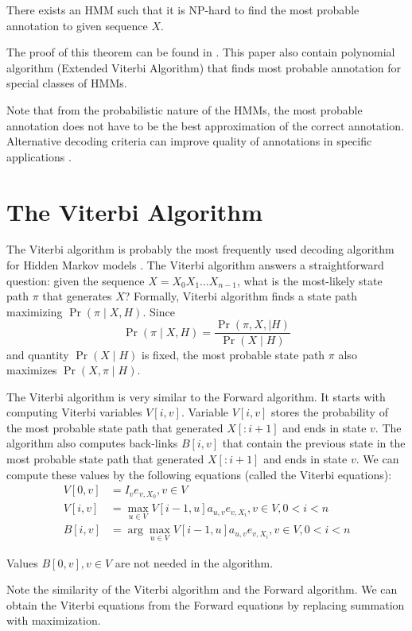 \begin{theorem}
There exists an HMM such that it is NP-hard to find the most probable annotation
to given sequence $X$.
\end{theorem}
The proof of this theorem can be found in \cite{Brejova2007mpa}. This paper also
contain polynomial algorithm (Extended Viterbi Algorithm) that finds most
probable annotation for special classes of HMMs. 

Note that from the probabilistic nature of the HMMs, the most probable
annotation does not have to be the best approximation of the correct annotation.
Alternative decoding criteria can improve quality of annotations in specific
applications \cite{Brown2010,Gross2007,Nanasi2010,Truszkowski2011}.

\section{The Viterbi Algorithm}
The Viterbi algorithm  is probably the most frequently used
decoding algorithm for Hidden Markov
models \cite{Durbin1998}.
The Viterbi algorithm answers a straightforward question: given the sequence
$X=X_0X_1\dots X_{n-1}$, what
is the most-likely state path $\pi$ that generates $X$? Formally, Viterbi
algorithm finds a state path maximizing $\Pr\left( \pi\mid X,H \right)$. Since
\[\Pr\left(\pi\mid X,H\right) = \frac{\Pr\left(\pi,X,\mid
H\right)}{\Pr\left(X\mid H\right)}\] and quantity $\Pr\left(X\mid H\right)$ is
fixed, the most probable state path $\pi$ also maximizes $\Pr\left(X,\pi\mid H\right)$. 

The Viterbi algorithm is very similar to the  Forward algorithm. It starts with computing
Viterbi variables $V[i,v]$. Variable $V[i,v]$ stores the probability of the most probable 
state path that generated $X[:i+1]$ and ends in state $v$. The algorithm
also computes back-links $B[i,v]$ that contain the previous state in the most
probable state path that generated $X[:i+1]$ and ends in state $v$. We can
compute these values by the following equations (called the Viterbi equations):
\begin{align}
V[0,v] &= I_{v}e_{v,X_0}, v\in V\\
V[i,v] &= \max_{u\in V} V[i-1,u]a_{u,v}e_{v,X_i}, v\in V,0<i<n\\
B[i,v] &= \arg\max_{u\in V} V[i-1,u]a_{u,v}e_{v,X_i}, v\in V,0<i<n
\end{align}
\begin{note}
Values $B[0,v],v\in V$ are not needed in the algorithm.

Note the similarity of the Viterbi algorithm and the Forward algorithm.
We can obtain the Viterbi equations from the Forward equations by replacing
summation with
maximization.
\end{note}



